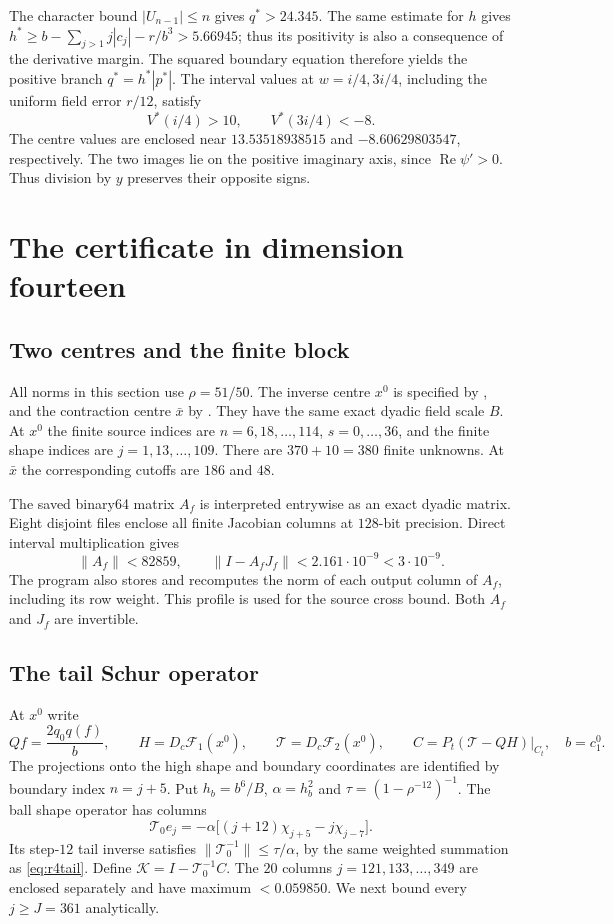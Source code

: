 \documentclass[11pt]{amsart}
\theoremstyle{remark}
\numberwithin{equation}{section}
\newcommand{\F}{\mathcal F}
\newcommand{\re}{\operatorname{Re}}
\newcommand{\norm}[1]{\lVert#1\rVert}
\newcommand{\Pt}{P_t}
\begin{document}
The character bound $|U_{n-1}|\le n$ gives $q^*>24.345$.
The same estimate for $h$ gives
$h^*\ge b-\sum_{j>1}j|c_j|-r/b^3>5.66945$; thus its positivity is also
a consequence of the derivative margin. The squared boundary equation
therefore yields the positive branch $q^*=h^*|p^*|$.
The interval values at $w=i/4,3i/4$, including the uniform field error
$r/12$, satisfy
\begin{equation}\label{eq:r4sign}
 V^*(i/4)>10,\qquad V^*(3i/4)<-8.
\end{equation}
The centre values are enclosed near $13.53518938515$ and
$-8.60629803547$, respectively. The two images lie on the positive
imaginary axis, since $\re\psi'>0$. Thus division by $y$ preserves
their opposite signs.

\section{The certificate in dimension fourteen}\label{sec:r14}
\subsection{Two centres and the finite block}
All norms in this section use $\rho=51/50$. The inverse centre $x^0$
is specified by , and the
contraction centre $\bar x$ by
. They have the same exact
dyadic field scale $B$. At $x^0$ the finite source indices are
$n=6,18,\ldots,114$, $s=0,\ldots,36$, and the finite shape indices are
$j=1,13,\ldots,109$. There are $370+10=380$ finite unknowns. At $\bar x$
the corresponding cutoffs are $186$ and $48$.

The saved binary64 matrix $A_f$ is interpreted entrywise as an exact
dyadic matrix. Eight disjoint files enclose all finite Jacobian columns
at $128$-bit precision. Direct interval multiplication gives
\begin{equation}\label{eq:r14finite}
 \norm{A_f}<82859,\qquad
 \norm{I-A_fJ_f}<2.161\cdot10^{-9}<3\cdot10^{-9}.
\end{equation}
The program also stores and recomputes the norm of each output column
of $A_f$, including its row weight. This profile is used for the source
cross bound. Both $A_f$ and $J_f$ are invertible.

\subsection{The tail Schur operator}
At $x^0$ write
\[
 Qf=\frac{2q_0q(f)}b,\qquad
 H=D_c\F_1(x^0),\qquad \mathcal T=D_c\F_2(x^0),\qquad
 C=\Pt(\mathcal T-QH)|_{C_t},\quad b=c_1^0.
\]
The projections onto the high shape and boundary coordinates are
identified by boundary index $n=j+5$. Put
$h_b=b^6/B$, $\alpha=h_b^2$ and $\tau=(1-\rho^{-12})^{-1}$.
The ball shape operator has columns
\[
 \mathcal T_0e_j=-\alpha\bigl[(j+12)\chi_{j+5}-j\chi_{j-7}\bigr].
\]
Its step-$12$ tail inverse satisfies
$\norm{\mathcal T_0^{-1}}\le\tau/\alpha$, by the same weighted summation as
\eqref{eq:r4tail}. Define $\mathcal K=I-\mathcal T_0^{-1}C$.
The $20$ columns $j=121,133,\ldots,349$ are enclosed separately and have
maximum $<0.059850$. We next bound every $j\ge J=361$ analytically.
\end{document}
